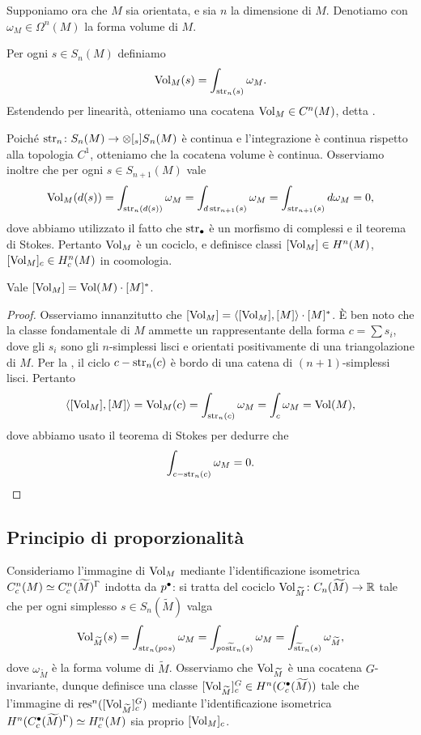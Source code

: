 Supponiamo ora che $M$ sia orientata, e sia $n$ la dimensione di $M$. Denotiamo con $\omega_M\in\Omega^n(M)$ la forma volume di $M$.
\begin{definition}
Per ogni $s\in S_n(M)$ definiamo
\[
\operatorname{Vol}_M(s)=\int_{\operatorname{str}_n(s)}\omega_M.
\]
Estendendo per linearità, otteniamo una cocatena $\operatorname{Vol}_M\in C^n(M)$, detta .
\end{definition}
Poiché $\map{\str_n}{S_n(M)}{\prepost[_s]{S}{_n}(M)}$ è continua e l'integrazione è continua rispetto alla topologia $C^1$, otteniamo che la cocatena volume è continua. Osserviamo inoltre che per ogni $s\in S_{n+1}(M)$ vale
\[
\operatorname{Vol}_M(d(s))=\int_{\operatorname{str}_n(d(s))}\omega_M=\int_{d\operatorname{str}_{n+1}(s)}\omega_M=\int_{\operatorname{str}_{n+1}(s)}d\omega_M=0,
\]
dove abbiamo utilizzato il fatto che $\operatorname{str}_\bullet$ è un morfismo di complessi e il teorema di Stokes. Pertanto $\operatorname{Vol}_M$ è un cociclo, e definisce classi $[\operatorname{Vol}_M]\in H^n(M)$, $[\operatorname{Vol}_M]_c\in H^n_c(M)$ in coomologia.

\begin{lemma}
Vale $[\operatorname{Vol}_M]=\operatorname{Vol}(M)\cdot[M]^*$.
\end{lemma}
\begin{proof}
Osserviamo innanzitutto che $[\operatorname{Vol}_M]=\langle[\operatorname{Vol}_M],[M]\rangle\cdot[M]^*$. È ben noto che la classe fondamentale di $M$ ammette un rappresentante della forma $c=\sum s_i$, dove gli $s_i$ sono gli $n$-simplessi lisci e orientati positivamente di una triangolazione di $M$. Per la , il ciclo $c-\operatorname{str}_n(c)$ è bordo di una catena di $(n+1)$-simplessi lisci. Pertanto
\[
\langle[\operatorname{Vol}_M],[M]\rangle=\operatorname{Vol}_M(c)=\int_{\operatorname{str}_n(c)}\omega_M=\int_{c}\omega_M=\operatorname{Vol}(M),
\]
dove abbiamo usato il teorema di Stokes per dedurre che
\[
\int_{c-\operatorname{str}_n(c)}\omega_M=0.\qedhere
\]
\end{proof}

\subsection{Principio di proporzionalità}

Consideriamo l'immagine di $\operatorname{Vol}_M$ mediante l'identificazione isometrica $C^n_c(M)\simeq C^n_c(\widetilde M)^\Gamma$ indotta da $p^\bullet$: si tratta del cociclo $\map{\Vol_{\widetilde M}}{C_n(\widetilde M)}{\RR}$ tale che per ogni simplesso $s\in S_n(\widetilde M)$ valga
\[
\operatorname{Vol}_{\widetilde M}(s)=\int_{\operatorname{str}_n(p\circ s)}\omega_M=\int_{p\circ\widetilde{\operatorname{str}}_n(s)}\omega_M=\int_{\widetilde{\operatorname{str}}_n(s)}\omega_{\widetilde M},
\]
dove $\omega_{\widetilde M}$ è la forma volume di $\widetilde M$. Osserviamo che $\operatorname{Vol}_{\widetilde M}$ è una cocatena $G$-invariante, dunque definisce una classe $[\operatorname{Vol}_{\widetilde M}]^G_c\in H^n(C^\bullet_c(\widetilde M))$ tale che l'immagine di $\operatorname{res}^n([\operatorname{Vol}_{\widetilde M}]^G_c)$ mediante l'identificazione isometrica $H^n(C^\bullet_c(\widetilde M)^\Gamma)\simeq H^n_c(M)$ sia proprio $[\operatorname{Vol}_M]_c$.

